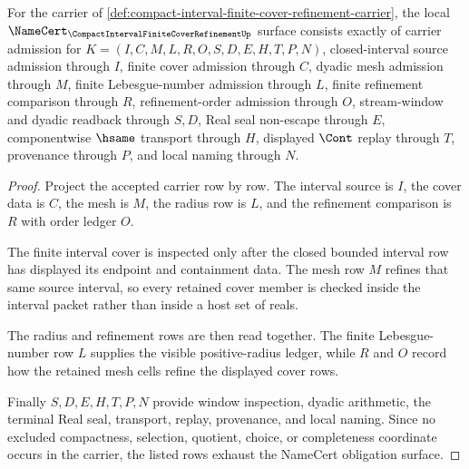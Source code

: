 \begin{theorem}
\label{thm:compact-interval-finite-cover-refinement-obligations}
For the carrier of \autoref{def:compact-interval-finite-cover-refinement-carrier}, the local $\NameCert_{\CompactIntervalFiniteCoverRefinementUp}$ surface consists exactly of carrier admission for $K=(I,C,M,L,R,O,S,D,E,H,T,P,N)$, closed-interval source admission through $I$, finite cover admission through $C$, dyadic mesh admission through $M$, finite Lebesgue-number admission through $L$, finite refinement comparison through $R$, refinement-order admission through $O$, stream-window and dyadic readback through $S,D$, Real seal non-escape through $E$, componentwise $\hsame$ transport through $H$, displayed $\Cont$ replay through $T$, provenance through $P$, and local naming through $N$.
\end{theorem}
\begin{proof}
Project the accepted carrier row by row. The interval source is $I$, the cover data is $C$, the mesh is $M$, the radius row is $L$, and the refinement comparison is $R$ with order ledger $O$.

The finite interval cover is inspected only after the closed bounded interval row has displayed its endpoint and containment data. The mesh row $M$ refines that same source interval, so every retained cover member is checked inside the interval packet rather than inside a host set of reals.

The radius and refinement rows are then read together. The finite Lebesgue-number row $L$ supplies the visible positive-radius ledger, while $R$ and $O$ record how the retained mesh cells refine the displayed cover rows.

Finally $S,D,E,H,T,P,N$ provide window inspection, dyadic arithmetic, the terminal Real seal, transport, replay, provenance, and local naming. Since no excluded compactness, selection, quotient, choice, or completeness coordinate occurs in the carrier, the listed rows exhaust the NameCert obligation surface.
\end{proof}

